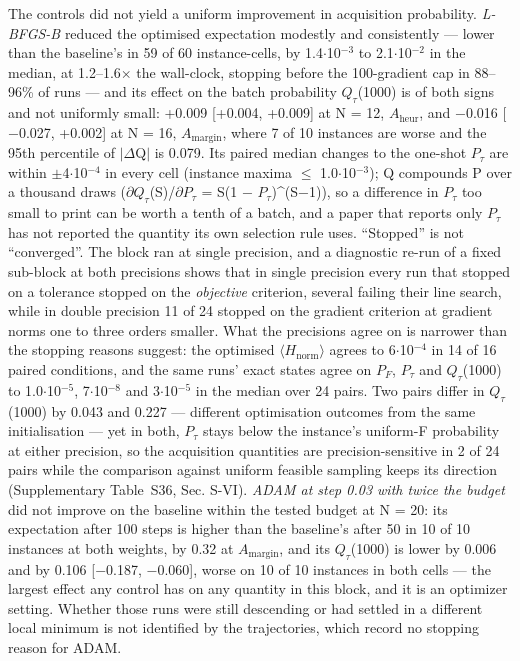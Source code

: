 \documentclass{ieeeaccess}
\begin{document}
The controls did not yield a uniform improvement in acquisition probability. \textit{L-BFGS-B} reduced the optimised expectation modestly and consistently --- lower than the baseline's in 59 of 60 instance-cells, by 1.4$\cdot$10$^{-3}$ to 2.1$\cdot$10$^{-2}$ in the median, at 1.2--1.6$\times$ the wall-clock, stopping before the 100-gradient cap in 88--96\% of runs --- and its effect on the batch probability $Q_{\tau}$(1000) is of both signs and not uniformly small: +0.009 [+0.004, +0.009] at N = 12, $A_{\mathrm{heur}}$, and $-$0.016 [$-$0.027, +0.002] at N = 16, $A_{\mathrm{margin}}$, where 7 of 10 instances are worse and the 95th percentile of $|$$\Delta$Q$|$ is 0.079. Its paired median changes to the one-shot $P_{\tau}$ are within $\pm$4$\cdot$10$^{-4}$ in every cell (instance maxima $\leq$ 1.0$\cdot$10$^{-3}$); Q compounds P over a thousand draws ($\partial$$Q_{\tau}$(S)/$\partial$$P_{\tau}$ = S(1 $-$ $P_{\tau}$)\^{}(S$-$1)), so a difference in $P_{\tau}$ too small to print can be worth a tenth of a batch, and a paper that reports only $P_{\tau}$ has not reported the quantity its own selection rule uses. ``Stopped'' is not ``converged''. The block ran at single precision, and a diagnostic re-run of a fixed sub-block at both precisions shows that in single precision every run that stopped on a tolerance stopped on the \textit{objective} criterion, several failing their line search, while in double precision 11 of 24 stopped on the gradient criterion at gradient norms one to three orders smaller. What the precisions agree on is narrower than the stopping reasons suggest: the optimised $\langle$$H_{\mathrm{norm}}$$\rangle$ agrees to 6$\cdot$10$^{-4}$ in 14 of 16 paired conditions, and the same runs' exact states agree on $P_{F}$, $P_{\tau}$ and $Q_{\tau}$(1000) to 1.0$\cdot$10$^{-5}$, 7$\cdot$10$^{-8}$ and 3$\cdot$10$^{-5}$ in the median over 24 pairs. Two pairs differ in $Q_{\tau}$(1000) by 0.043 and 0.227 --- different optimisation outcomes from the same initialisation --- yet in both, $P_{\tau}$ stays below the instance's uniform-F probability at either precision, so the acquisition quantities are precision-sensitive in 2 of 24 pairs while the comparison against uniform feasible sampling keeps its direction (Supplementary Table~S36, Sec. S-VI). \textit{ADAM at step 0.03 with twice the budget} did not improve on the baseline within the tested budget at N = 20: its expectation after 100 steps is higher than the baseline's after 50 in 10 of 10 instances at both weights, by 0.32 at $A_{\mathrm{margin}}$, and its $Q_{\tau}$(1000) is lower by 0.006 and by 0.106 [$-$0.187, $-$0.060], worse on 10 of 10 instances in both cells --- the largest effect any control has on any quantity in this block, and it is an optimizer setting. Whether those runs were still descending or had settled in a different local minimum is not identified by the trajectories, which record no stopping reason for ADAM.
\end{document}
